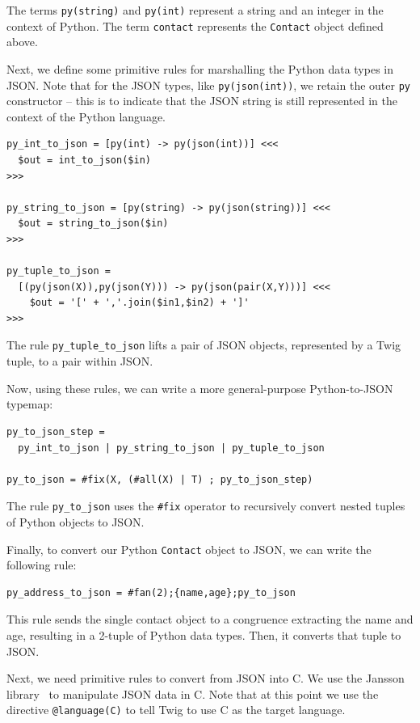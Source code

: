 The terms \texttt{py(string)} and \texttt{py(int)} represent a
string and an integer in the context of Python. The term
\texttt{contact} represents the \texttt{Contact} object defined
above.

Next, we define some primitive rules for marshalling the Python
data types in JSON. Note that for the JSON types, like
\texttt{py(json(int))}, we retain the outer \texttt{py}
constructor -- this is to indicate that the JSON string is still
represented in the context of the Python language.

\begin{verbatim}
py_int_to_json = [py(int) -> py(json(int))] <<<
  $out = int_to_json($in)
>>>

py_string_to_json = [py(string) -> py(json(string))] <<<
  $out = string_to_json($in)
>>>

py_tuple_to_json = 
  [(py(json(X)),py(json(Y))) -> py(json(pair(X,Y)))] <<<
    $out = '[' + ','.join($in1,$in2) + ']'
>>>
\end{verbatim}

The rule \texttt{py\_tuple\_to\_json} lifts a pair of JSON
objects, represented by a Twig tuple, to a pair within JSON.

Now, using these rules, we can write a more general-purpose
Python-to-JSON typemap:

\begin{verbatim}
py_to_json_step = 
  py_int_to_json | py_string_to_json | py_tuple_to_json

py_to_json = #fix(X, (#all(X) | T) ; py_to_json_step)
\end{verbatim}

The rule \texttt{py\_to\_json} uses the \texttt{\#fix} operator to
recursively convert nested tuples of Python objects to JSON.

Finally, to convert our Python \texttt{Contact} object to JSON, we
can write the following rule:

\begin{verbatim}
py_address_to_json = #fan(2);{name,age};py_to_json
\end{verbatim}

This rule sends the single contact object to a congruence
extracting the name and age, resulting in a 2-tuple of Python data
types. Then, it converts that tuple to JSON.

Next, we need primitive rules to convert from JSON into C. We use
the Jansson library~\cite{jansson} to manipulate JSON data in C.
Note that at this point we use the directive \texttt{@language(C)}
to tell Twig to use C as the target language.

